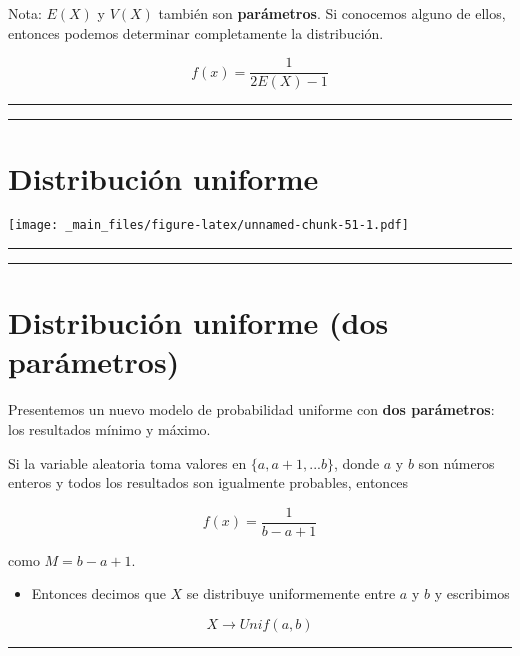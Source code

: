 \documentclass[
]{book}
\providecommand{\tightlist}{%
  \setlength{\itemsep}{0pt}\setlength{\parskip}{0pt}}
\begin{document}
Nota: \(E(X)\) y \(V(X)\) también son \textbf{parámetros}. Si conocemos alguno de ellos, entonces podemos determinar completamente la distribución.

\[f(x)=\frac{1}{2E(X)-1}\]

\begin{center}\rule{0.5\linewidth}{0.5pt}\end{center}

\begin{center}\rule{0.5\linewidth}{0.5pt}\end{center}

\hypertarget{distribuciuxf3n-uniforme}{%
\section{Distribución uniforme}\label{distribuciuxf3n-uniforme}}

\texttt{[image: \_main\_files/figure-latex/unnamed-chunk-51-1.pdf]}

\begin{center}\rule{0.5\linewidth}{0.5pt}\end{center}

\begin{center}\rule{0.5\linewidth}{0.5pt}\end{center}

\hypertarget{distribuciuxf3n-uniforme-dos-paruxe1metros}{%
\section{Distribución uniforme (dos parámetros)}\label{distribuciuxf3n-uniforme-dos-paruxe1metros}}

Presentemos un nuevo modelo de probabilidad uniforme con \textbf{dos parámetros}: los resultados mínimo y máximo.

Si la variable aleatoria toma valores en \(\{a, a+1, ...b\}\), donde \(a\) y \(b\) son números enteros y todos los resultados son igualmente probables, entonces

\[f(x)=\frac{1}{b-a+1}\]

como \(M=b-a+1\).

\begin{itemize}
\tightlist
\item
  Entonces decimos que \(X\) se distribuye uniformemente entre \(a\) y \(b\) y escribimos
\end{itemize}

\[X \rightarrow Unif(a,b)\]

\begin{center}\rule{0.5\linewidth}{0.5pt}\end{center}
\end{document}
